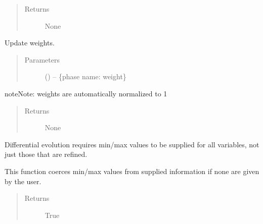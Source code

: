 \documentclass[letterpaper,10pt,english]{sphinxmanual}
\begin{document}
\begin{fulllineitems}
\begin{fulllineitems}
\begin{quote}
\begin{description}
\item[{Returns}] \leavevmode
None

\end{description}\end{quote}

\end{fulllineitems}


\begin{fulllineitems}
\label{\detokenize{rst/refinement:mstack.refinement.Refinement.update_weights}}
Update weights.
\begin{quote}\begin{description}
\item[{Parameters}] \leavevmode
{} () -- \{phase name: weight\}

\end{description}\end{quote}

\begin{sphinxadmonition}{note}{Note:}
weights are automatically normalized to 1
\end{sphinxadmonition}
\begin{quote}\begin{description}
\item[{Returns}] \leavevmode
None

\end{description}\end{quote}

\end{fulllineitems}


\begin{fulllineitems}
\label{\detokenize{rst/refinement:mstack.refinement.Refinement.validate_diffev}}
Differential evolution requires min/max values to be supplied for all
variables, not just those that are refined.

This function coerces min/max values from supplied information if none
are given by the user.
\begin{quote}\begin{description}
\item[{Returns}] \leavevmode
True


\end{description}
\end{quote}
\end{fulllineitems}
\end{fulllineitems}
\end{document}
